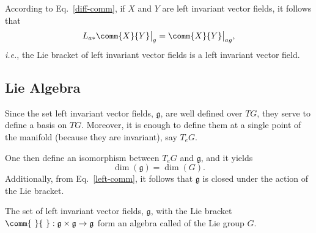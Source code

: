 According to Eq.~\eqref{diff-comm}, if $X$ and $Y$ are left invariant vector fields, it follows that
\begin{equation}
  L_{a*} \comm{X}{Y} \bigr|_{g} = \comm{X}{Y} \bigr|_{ag},
  \label{left-comm}
\end{equation}
\emph{i.e.}, the Lie bracket of left invariant vector fields is a left invariant vector field.

\subsection{Lie Algebra}

Since the set left invariant vector fields, $\mathfrak{g}$, are well defined over $TG$, they serve to define a basis on $TG$. Moreover, it is enough to define them at a single point of the manifold (because they are invariant), say $T_e G$.

One then define an isomorphism between $T_e G$ and $\mathfrak{g}$, and it yields
\begin{equation*}
  \dim(\mathfrak{g}) = \dim(G).
\end{equation*}
Additionally, from Eq.~\eqref{left-comm}, it follows that $\mathfrak{g}$ is closed under the action of the Lie bracket.

\begin{Def}
  The set of left invariant vector fields, $\mathfrak{g}$, with the Lie bracket $\comm{\ }{\ }: \mathfrak{g} \times \mathfrak{g} \to \mathfrak{g}$ form an algebra called \emph{} of the Lie group $G$.
\end{Def}
